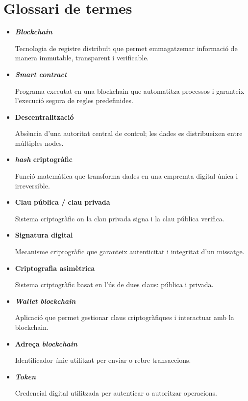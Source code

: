\section{Glossari de termes}

\begin{itemize}
\item \hypertarget{def:blockchain}{\textbf{\textit{Blockchain}}} Tecnologia de registre distribuït que permet emmagatzemar informació de manera immutable, transparent i verificable.

\item \hypertarget{def:smartcontract}{\textbf{\textit{Smart contract}}} Programa executat en una blockchain que automatitza processos i garanteix l'execució segura de regles predefinides.

\item \hypertarget{def:descentralitzacio}{\textbf{Descentralització}} Absència d'una autoritat central de control; les dades es distribueixen entre múltiples nodes.

\item \hypertarget{def:\textit{hash}}{\textbf{\textit{hash} criptogràfic}} Funció matemàtica que transforma dades en una empremta digital única i irreversible.

\item \hypertarget{def:claus}{\textbf{Clau pública / clau privada}} Sistema criptogràfic on la clau privada signa i la clau pública verifica.

\item \hypertarget{def:signaturadigital}{\textbf{Signatura digital}} Mecanisme criptogràfic que garanteix autenticitat i integritat d'un missatge.

\item \hypertarget{def:criptografiaasimetrica}{\textbf{Criptografia asimètrica}} Sistema criptogràfic basat en l'ús de dues claus: pública i privada.

\item \hypertarget{def:wallet}{\textbf{\textit{Wallet blockchain}}} Aplicació que permet gestionar claus criptogràfiques i interactuar amb la blockchain.

\item \hypertarget{def:adreca}{\textbf{Adreça \textit{blockchain}}} Identificador únic utilitzat per enviar o rebre transaccions.

\item \hypertarget{def:token}{\textbf{\textit{Token}}} Credencial digital utilitzada per autenticar o autoritzar operacions.


\end{itemize}

